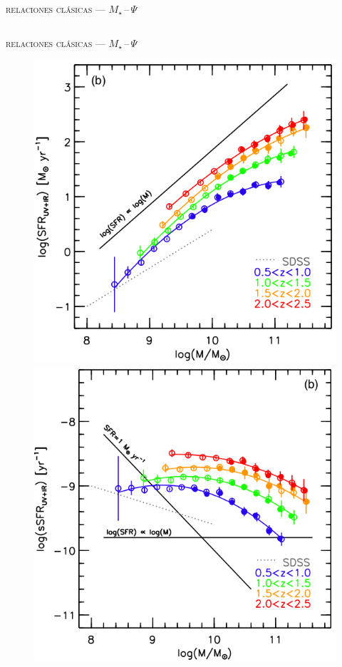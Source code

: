 \documentclass[xcolor=dvipsnames,4pt,fleqn,hyperref={colorlinks,citecolor=black,linkcolor=black,urlcolor=black}]{beamer}
\begin{document}
\begin{frame}{\textsc{relaciones clásicas --- $M_\star\,$--$\,\Psi$}}
\begin{columns}
\end{columns}
\end{frame}

\begin{frame}{\textsc{relaciones clásicas --- $M_\star\,$--$\,\Psi$}}

\begin{figure}
\includegraphics[scale=0.6]{img/whitaker2014-1}
\includegraphics[scale=0.6]{img/whitaker2014-2}

\end{figure}
\end{frame}
\end{document}
